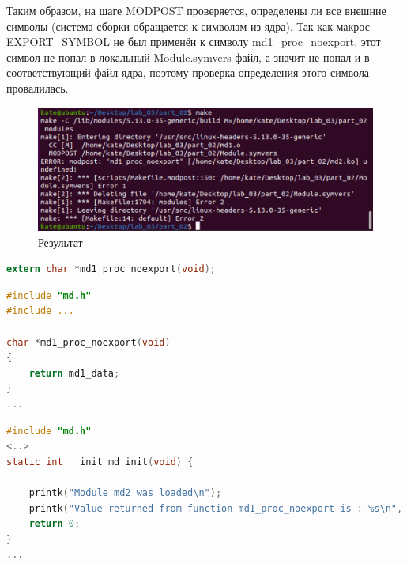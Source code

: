 \documentclass[12pt]{report}
\begin{document}
Таким образом, на шаге MODPOST проверяется, определены ли все внешние символы (система сборки обращается к символам из ядра). Так как макрос EXPORT\_SYMBOL не был применён к символу md1\_proc\_noexport, этот символ не попал в локальный Module.symvers файл, а значит не попал и в соответствующий файл ядра, поэтому проверка определения этого символа провалилась.

\begin{figure}[H]
	\centering
	\includegraphics[scale = 0.6]{no_exp_symb.png}
	\caption{Результат}
	\label{02_res}
\end{figure}

\begin{lstlisting}[label=01_mdh,caption=md.h,language=C]
extern char *md1_proc_noexport(void);
\end{lstlisting}
\newpage
\begin{lstlisting}[label=01_md1,caption=md1.c,language=C]
#include "md.h"
#include ...

char *md1_proc_noexport(void)
{
	return md1_data;
}
...
\end{lstlisting}

\begin{lstlisting}[label=01_md2,caption=md2.c,language=C]
#include "md.h"
<..>
static int __init md_init(void) {
    
    printk("Module md2 was loaded\n");
    printk("Value returned from function md1_proc_noexport is : %s\n", md1_proc_noexport());
    return 0;
}
...
\end{lstlisting}
\newpage
\end{document}
